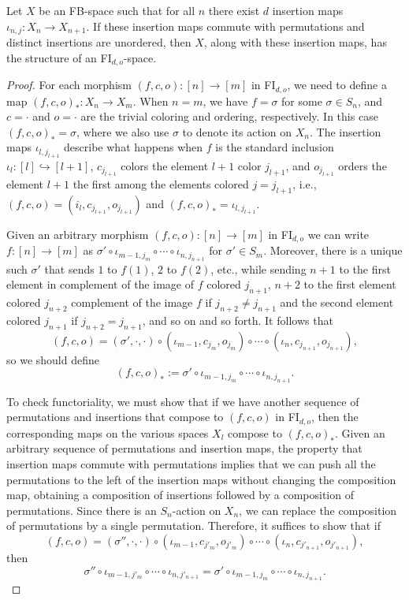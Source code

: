 \documentclass[10pt,a4paper]{amsart}
\begin{document}
\begin{prop}\label{conditions for FIOk space}
Let $X$ be an FB-space such that for all $n$ there exist $d$ insertion maps $\iota_{n, j}:X_{n}\to X_{n+1}$.
If these insertion maps commute with permutations and distinct insertions are unordered, then $X$, along with these insertion maps, has the structure of an FI$_{d,o}$-space.
\end{prop}

\begin{proof}
For each morphism $(f, c, o):[n]\to [m]$ in FI$_{d,o}$, we need to define a map $(f, c, o)_{*}:X_{n}\to X_{m}$.
When $n=m$, we have $f=\sigma$ for some $\sigma\in S_{n}$, and $c=\cdot$ and $o=\cdot$ are the trivial coloring and ordering, respectively.
In this case $(f, c, o)_{*}=\sigma$, where we also use $\sigma$ to denote its action on $X_{n}$.
The insertion maps $\iota_{l,j_{l+1}}$ describe what happens when $f$ is the standard inclusion $\iota_{l}:[l]\hookrightarrow [l+1]$, $c_{j_{l+1}}$ colors the element $l+1$ color $j_{l+1}$, and $o_{j_{l+1}}$ orders the element $l+1$ the first among the elements colored $j=j_{l+1}$, i.e., $(f, c, o)=(i_{l}, c_{j_{l+1}}, o_{j_{l+1}})$ and $(f, c, o)_{*}=\iota_{l, j_{l+1}}$.

Given an arbitrary morphism $(f, c, o):[n]\to[m]$ in FI$_{d,o}$ we can write $f:[n]\to [m]$ as $\sigma'\circ \iota_{m-1, j_{m}}\circ\cdots\circ \iota_{n, j_{n+1}}$ for $\sigma'\in S_{m}$.
Moreover, there is a unique such $\sigma'$ that sends $1$ to $f(1)$, $2$ to $f(2)$, etc., while sending $n+1$ to the first element in complement of the image of $f$ colored $j_{n+1}$, $n+2$ to the first element colored $j_{n+2}$ complement of the image $f$ if $j_{n+2}\neq j_{n+1}$ and the second element colored $j_{n+1}$ if $j_{n+2}=j_{n+1}$, and so on and so forth.
It follows that 
\[
(f, c, o)=(\sigma', \cdot, \cdot)\circ(\iota_{m-1}, c_{j_{m}}, o_{j_{m}})\circ\cdots\circ (\iota_{n}, c_{j_{n+1}}, o_{j_{n+1}}),
\]
so we should define
\[
(f, c, o)_{*}:=\sigma'\circ\iota_{m-1, j_{m}}\circ\cdots\circ\iota_{n, j_{n+1}}.
\]

To check functoriality, we must show that if we have another sequence of permutations and insertions that compose to $(f, c, o)$ in FI$_{d,o}$, then the corresponding maps on the various spaces $X_{l}$ compose to $(f, c, o)_{*}$.
Given an arbitrary sequence of permutations and insertion maps, the property that insertion maps commute with permutations implies that we can push all the permutations to the left of the insertion maps without changing the composition map, obtaining a composition of insertions followed by a composition of permutations.
Since there is an $S_{n}$-action on $X_{n}$, we can replace the composition of permutations by a single permutation.
Therefore, it suffices to show that if
\[
(f, c, o)=(\sigma'', \cdot, \cdot)\circ (\iota_{m-1}, c_{j'_{m}}, o_{j'_{m}})\circ \cdots\circ(\iota_{n}, c_{j'_{n+1}}, o_{j'_{n+1}}),
\]
then
\[
\sigma''\circ\iota_{m-1, j'_{m}}\circ \cdots\circ\iota_{n, j'_{n+1}}=\sigma'\circ\iota_{m-1, j_{m}}\circ \cdots\circ\iota_{n, j_{n+1}}.
\]


\end{proof}
\end{document}
